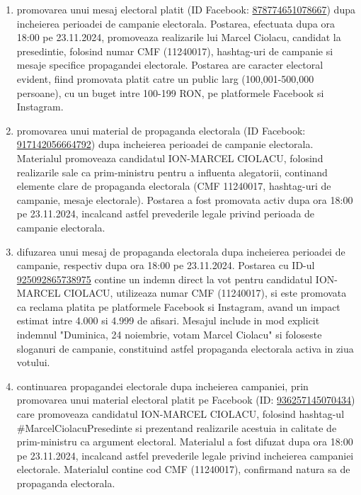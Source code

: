 \documentclass[a4paper,12pt]{article}
\begin{document}
\begin{enumerate}[leftmargin=*, label=\arabic*.)]
    \item promovarea unui mesaj electoral platit (ID Facebook: \href{https://www.facebook.com/ads/library/?id=878774651078667}{878774651078667}) dupa incheierea perioadei de campanie electorala. Postarea, efectuata dupa ora 18:00 pe 23.11.2024, promoveaza realizarile lui Marcel Ciolacu, candidat la presedintie, folosind numar CMF (11240017), hashtag-uri de campanie si mesaje specifice propagandei electorale. Postarea are caracter electoral evident, fiind promovata platit catre un public larg (100,001-500,000 persoane), cu un buget intre 100-199 RON, pe platformele Facebook si Instagram.
    \item promovarea unui material de propaganda electorala (ID Facebook: \href{https://www.facebook.com/ads/library/?id=917142056664792}{917142056664792}) dupa incheierea perioadei de campanie electorala. Materialul promoveaza candidatul ION-MARCEL CIOLACU, folosind realizarile sale ca prim-ministru pentru a influenta alegatorii, continand elemente clare de propaganda electorala (CMF 11240017, hashtag-uri de campanie, mesaje electorale). Postarea a fost promovata activ dupa ora 18:00 pe 23.11.2024, incalcand astfel prevederile legale privind perioada de campanie electorala.
    \item difuzarea unui mesaj de propaganda electorala dupa incheierea perioadei de campanie, respectiv dupa ora 18:00 pe 23.11.2024. Postarea cu ID-ul \href{https://www.facebook.com/ads/library/?id=925092865738975}{925092865738975} contine un indemn direct la vot pentru candidatul ION-MARCEL CIOLACU, utilizeaza numar CMF (11240017), si este promovata ca reclama platita pe platformele Facebook si Instagram, avand un impact estimat intre 4.000 si 4.999 de afisari. Mesajul include in mod explicit indemnul "Duminica, 24 noiembrie, votam Marcel Ciolacu" si foloseste sloganuri de campanie, constituind astfel propaganda electorala activa in ziua votului.
    \item continuarea propagandei electorale dupa incheierea campaniei, prin promovarea unui material electoral platit pe Facebook (ID: \href{https://www.facebook.com/ads/library/?id=936257145070434}{936257145070434}) care promoveaza candidatul ION-MARCEL CIOLACU, folosind hashtag-ul \#MarcelCiolacuPresedinte si prezentand realizarile acestuia in calitate de prim-ministru ca argument electoral. Materialul a fost difuzat dupa ora 18:00 pe 23.11.2024, incalcand astfel prevederile legale privind incheierea campaniei electorale. Materialul contine cod CMF (11240017), confirmand natura sa de propaganda electorala.

\end{enumerate}
\end{document}
